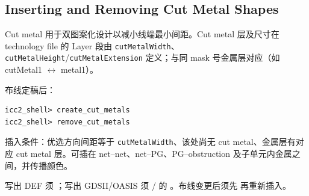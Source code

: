 \subsection*{Inserting and Removing Cut Metal Shapes}

Cut metal 用于双图案化设计以减小线端最小间距。Cut metal 层及尺寸在 technology file 的 Layer 段由 \texttt{cutMetalWidth}、\texttt{cutMetalHeight}/\texttt{cutMetalExtension} 定义；与同 mask 号金属层对应（如 cutMetal1 $\leftrightarrow$ metal1）。

布线定稿后：
\begin{lstlisting}
icc2_shell> create_cut_metals
icc2_shell> remove_cut_metals
\end{lstlisting}

插入条件：优选方向间距等于 \texttt{cutMetalWidth}、该处尚无 cut metal、金属层有对应 cut metal 层。可插在 net--net、net--PG、PG--obstruction 及子单元内金属之间，并传播颜色。

写出 DEF 须 ；写出 GDSII/OASIS 须 / 的 。布线变更后须先  再重新插入。

